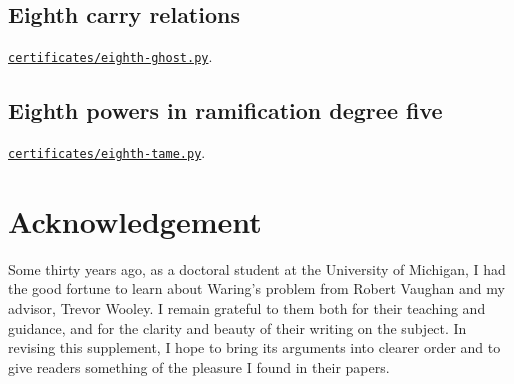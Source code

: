 \documentclass[11pt]{amsart}
\theoremstyle{definition}
\numberwithin{equation}{section}
\begin{document}
\subsection{Eighth carry relations}\label{app:eighth-ghost}
\href{https://github.com/morley988/warings-problem/blob/3752a566d4ae778c3f2effaeb7caec4fc8899514/supplements/number-field/small-powers/certificates/eighth-ghost.py}{\texttt{certificates/eighth-ghost.py}}.

\subsection{Eighth powers in ramification degree five}\label{app:eighth-tame}
\href{https://github.com/morley988/warings-problem/blob/3752a566d4ae778c3f2effaeb7caec4fc8899514/supplements/number-field/small-powers/certificates/eighth-tame.py}{\texttt{certificates/eighth-tame.py}}.

\section*{Acknowledgement}
Some thirty years ago, as a doctoral student at the University of Michigan,
I had the good fortune to learn about Waring's problem from Robert Vaughan
and my advisor, Trevor Wooley. I remain grateful to them both for their
teaching and guidance, and for the clarity and beauty of their writing
on the subject. In revising this supplement, I hope to bring its arguments
into clearer order and to give readers something of the pleasure I found
in their papers.
\end{document}
